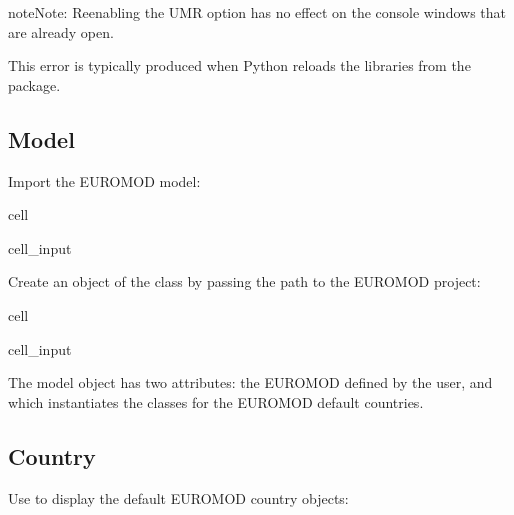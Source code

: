 \documentclass[letterpaper,10pt,english]{sphinxmanual}
\begin{document}
\begin{sphinxadmonition}{note}{Note:}
\sphinxAtStartPar
Re\sphinxhyphen{}enabling the UMR option has no effect on the console windows that are already open.
\end{sphinxadmonition}

\sphinxAtStartPar
This error is typically produced when Python reloads the libraries from the  package.


\subsection{Model}
\label{\detokenize{notebooks/userguide:model}}
\sphinxAtStartPar
Import the EUROMOD model:

\begin{sphinxuseclass}{cell}
\begin{sphinxuseclass}{cell_input}
\begin{sphinxVerbatim}[commandchars=\\\{\}]
   
\end{sphinxVerbatim}

\end{sphinxuseclass}
\end{sphinxuseclass}
\sphinxAtStartPar
Create an object of the  class by passing the path to the  EUROMOD project:

\begin{sphinxuseclass}{cell}
\begin{sphinxuseclass}{cell_input}
\begin{sphinxVerbatim}[commandchars=\\\{\}]
  
\end{sphinxVerbatim}

\end{sphinxuseclass}
\end{sphinxuseclass}
\sphinxAtStartPar
The model object  has two attributes: the EUROMOD  defined by the user, and  which instantiates the  classes for the EUROMOD default countries.


\subsection{Country}
\label{\detokenize{notebooks/userguide:country}}
\sphinxAtStartPar
Use  to display the default EUROMOD country objects:
\end{document}
